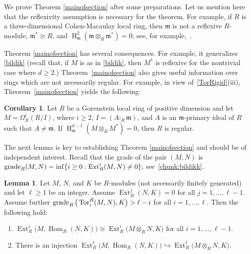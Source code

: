 \documentclass[11pt]{amsart}
\theoremstyle{definition}
\newtheorem{cor}[thm]{Corollary}
\theoremstyle{definition}
\newtheorem{lem}[thm]{Lemma}
\numberwithin{equation}{section}
\newcommand{\fm}{\mathfrak{m}}
\DeclareMathOperator{\gr}{\textnormal{grade}}
\DeclareMathOperator{\Ext}{Ext}
\DeclareMathOperator{\hh}{H}
\DeclareMathOperator{\Hom}{Hom}
\DeclareMathOperator{\Tor}{Tor}
\begin{document}
We prove Theorem \ref{mainofsection} after some preparations. Let us mention here that the reflexivity assumption is necessary for the theorem. For example, if $R$ is a three-dimensional Cohen-Macaulay local ring, then $\fm$ is not a reflexive $R$-module, $\fm^{\ast}\cong R$, and $\hh^{2}_{\fm}(\fm\otimes_R\fm^{\ast})=0$; see, for example,~\cite[5.4]{MA}.

Theorem \ref{mainofsection} has several consequences. For example, it generalizes \ref{bildik} (recall that, if $M$ is as in \ref{bildik}, then $M^{\ast}$ is reflexive for the nontrivial case where $d\geq 2$.) Theorem~\ref{mainofsection} also gives useful information over rings which are not necessarily regular. For example, in view of~\ref{TorRigid}(iii), Theorem~\ref{mainofsection} yields the following:

\begin{cor} Let $R$ be a Gorenstein local ring of positive dimension and let $M=\Omega^i_R(R/I)$, where $i\geq 2$, $I=(A:_R\fm)$, and $A$ is an $\fm$-primary ideal of $R$ such that $A \neq \fm$. If $\hh^{d-1}_{\fm}(M\otimes_RM^*)=0$, then $R$ is regular.
\end{cor}

The next lemma is key to establishing Theorem \ref{mainofsection} and should be of independent interest. Recall that the grade of the pair $(M,N)$ is $\gr_R(M,N)=\inf\{i\geq 0: \Ext^i_R(M,N)\neq 0\}$; see~\ref{chunk:bildikk}.

\begin{lem}\label{duality} Let $M$, $N$, and $K$ be $R$-modules (not necessarily finitely generated) and let $\ell \geq 1$ be an integer. Assume $\Ext^j_R(N,K)=0$ for all $j=1, \ldots, \ell-1$. Assume further $\gr_R\big(\Tor_i^R(M,N),K\big)>\ell-i$ for all $i=1, \ldots, \ell$. Then the following hold:
\begin{enumerate}[\rm(i)]
\item $\Ext^i_R\big(M,\Hom_R(N,K)\big)\cong\Ext^i_R\big(M\otimes_RN,K\big)$ for all $i=1, \ldots, \ell-1$. 
\item There is an injection $\Ext^\ell_R\big(M,\Hom_R(N,K)\big)\hookrightarrow\Ext^\ell_R\big(M\otimes_RN,K\big)$.
\end{enumerate}	
\end{lem}
\end{document}
